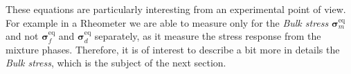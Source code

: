 These equations are particularly interesting from an experimental point of view. 
For example in a Rheometer we are able to measure only for the \textit{Bulk stress} $\bm\sigma^\text{eq}_m$ and not $\bm\sigma^\text{eq}_f$ and $\bm\sigma^\text{eq}_d$ separately, as it measure the stress response from the mixture phases. 
Therefore, it is of interest to describe a bit more in details the \textit{Bulk stress}, which is the subject of the next section.